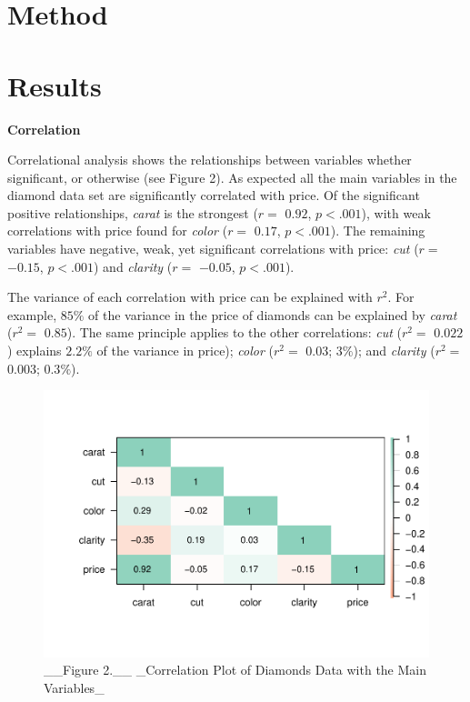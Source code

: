 \documentclass[
]{article}
\begin{document}
\hypertarget{method}{%
\section{Method}\label{method}}

\hypertarget{results}{%
\section{Results}\label{results}}

\textbf{Correlation}

Correlational analysis shows the relationships between variables whether
significant, or otherwise (see Figure 2). As expected all the main
variables in the diamond data set are significantly correlated with
price. Of the significant positive relationships, \emph{carat} is the
strongest (\(r=\) \(0.92\), \(p< .001\)), with weak correlations with
price found for \emph{color} (\(r=\) \(0.17\), \(p< .001\)). The
remaining variables have negative, weak, yet significant correlations
with price: \emph{cut} (\(r=\) \(-0.15\), \(p< .001\)) and
\emph{clarity} (\(r=\) \(-0.05\), \(p< .001\)).

The variance of each correlation with price can be explained with
\(r^2\). For example, \(85\%\) of the variance in the price of diamonds
can be explained by \emph{carat} (\(r^2=\) \(0.85\)). The same principle
applies to the other correlations: \emph{cut} (\(r^2=\) \(0.022\))
explains \(2.2\%\) of the variance in price); \emph{color} (\(r^2=\)
\(0.03\); \(3\%\)); and \emph{clarity} (\(r^2=\) \(0.003\); \(0.3\%\)).

\begin{figure}

{\centering \includegraphics{diamonds_files/figure-latex/corr plot-1} 

}

\caption{__Figure 2.__ _Correlation Plot of Diamonds Data with the Main Variables_}\label{fig:corr plot}
\end{figure}
\end{document}
